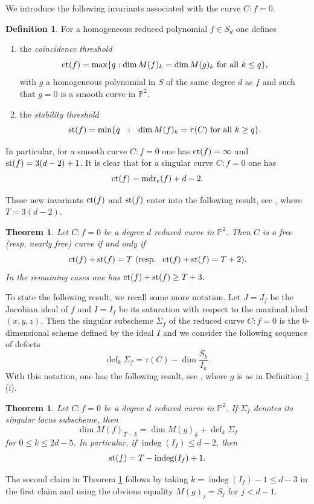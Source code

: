 \documentclass[12pt]{amsart}
\theoremstyle{plain}
\newtheorem{thm}[subsection]{Theorem}
\theoremstyle{definition}
\newtheorem{definition}[subsection]{Definition}
\numberwithin{equation}{section}
\newcommand{\PP}{\mathbb{P}}
\DeclareMathOperator{\defect}{def}
\DeclareMathOperator{\indeg}{indeg}
\begin{document}
We introduce the following  invariants associated with the curve $C:f=0$.
\begin{definition}
\label{defCTST} For a homogeneous reduced polynomial $f \in S_d$ one defines
\begin{enumerate}
\item [(i)] the {\it coincidence threshold}
$${\rm ct}(f)=\max \{q:\dim M(f)_k=\dim M(g)_k \text{ for all } k \leq q\},$$
with $g$  a homogeneous polynomial in $S$ of the same degree $d$ as $f$ and such that $g=0$ is a smooth curve in $\PP^2$.
\item [(ii)] the {\it stability threshold}
$${\rm st}(f)=\min \{q~~:~~\dim M(f)_k=\tau(C) \text{ for all } k \geq q\}.$$
\end{enumerate}
\end{definition}
In particular, for a smooth curve $C:f=0$  one has ${\rm ct}(f)=\infty$ and ${\rm st}(f)=3(d-2)+1$.
It is clear that  for a singular curve $C:f=0$ one has
\begin{equation}
\label{REL}
{\rm ct}(f) ={\rm mdr}_e(f)+d-2.
\end{equation}


These new invariants ${\rm ct}(f)$ and ${\rm st}(f)$ enter into the following result, see \cite[Corollary 1.7]{Dmax}, where $T=3(d-2)$.
\begin{thm}
\label{ct+st}
Let $C:f=0$ be a degree $d$ reduced curve in $\PP^2$. Then $C$ is a free (resp. nearly free) curve if and only if 
$${\rm ct}(f)+ {\rm st}(f)=T \text{ (resp.  }   \  {\rm ct}(f)+ {\rm st}(f)=T+2). $$
In the remaining cases one has ${\rm ct}(f)+ {\rm st}(f)\geq T+3.$
\end{thm}

To state the following result,  we recall some more notation. 
Let $J=J_f$ be the Jacobian ideal of $f$ and $I=I_f$ be its saturation with respect to the maximal ideal $(x,y,z)$. Then the singular subscheme $\Sigma_f$ of the reduced curve $C:f=0$ is the 0-dimensional scheme defined by the ideal $I$ and we consider the following sequence of defects
\begin{equation} 
\label{eqDEF}
\defect _k\Sigma_f=\tau(C)-\dim \frac{S_k}{I_k}.
\end{equation}
With this notation, one has the following result, see \cite[Theorem 1]{Bull13}, where $g$ is as in  Definition \ref{defCTST} (i).

\begin{thm}
\label{linsys}
Let $C:f=0$ be a degree $d$ reduced curve in $\PP^2$. If $\Sigma_f$ denotes its singular locus subscheme, then
$$\dim M(f)_{T-k}= \dim M(g)_{k} +\defect _k\Sigma_f $$
for $0\leq k \leq 2d-5$. In particular, if $\indeg (I_f) \leq d-2$, then
$${\rm st}(f)=T-\indeg(I_f)+1.$$
\end{thm}
The second claim in Theorem \ref{linsys} follows by taking $k=\indeg (I_f)-1 \leq d-3$ in the first claim and using the obvious equality
$M(g)_j=S_j$ for $j<d-1$.
\end{document}
